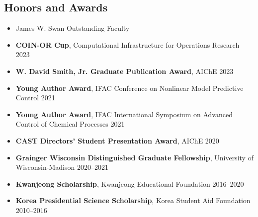 \message{ !name(shin-abet.tex)}\documentclass[letterpaper, 11pt]{article}
\begin{document}

\thispagestyle{empty}







\subsection*{Honors and Awards}
\begin{itemize}[leftmargin=*,itemsep=0pt]
\item[] {James W. Swan Outstanding Faculty}
\item[] \textbf{COIN-OR Cup}, Computational Infrastructure for Operations Research \hfill 2023
\item[] \textbf{W. David Smith, Jr. Graduate Publication Award}, AIChE \hfill 2023
\item[] \textbf{Young Author Award}, IFAC Conference on Nonlinear Model Predictive Control \hfill 2021
\item[] \textbf{Young Author Award}, IFAC International Symposium on Advanced Control of Chemical Processes \hfill 2021
\item[] \textbf{CAST Directors' Student Presentation Award}, AIChE \hfill 2020
\item[] \textbf{Grainger Wisconsin Distinguished Graduate Fellowship}, University of Wisconsin-Madison \hfill 2020--2021
\item[] \textbf{Kwanjeong Scholarship}, Kwanjeong Educational Foundation \hfill 2016--2020
\item[] \textbf{Korea Presidential Science Scholarship}, Korea Student Aid Foundation \hfill 2010--2016
\end{itemize}
\end{document}
